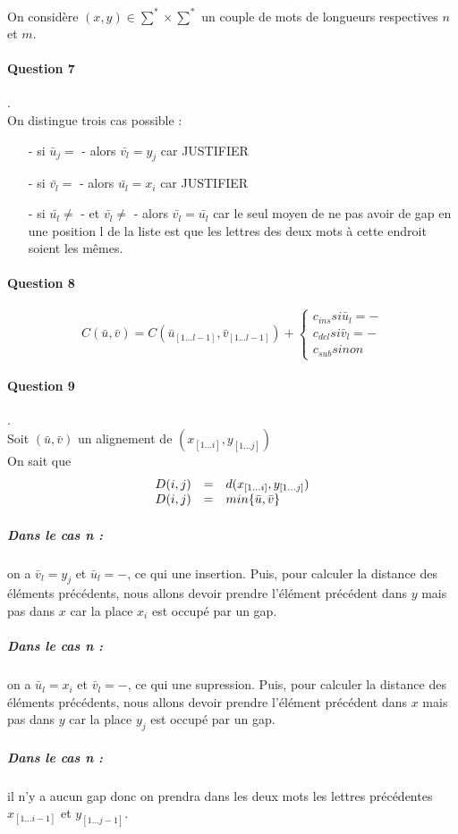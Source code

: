 On considère $(x,y)\in \sum^* \times \sum^*$ un couple de mots de longueurs respectives $n$ et $m$.
\paragraph{Question 7}.\\
On distingue trois cas possible :\begin{itemize}
\item[-] si $\bar{u}_j =$ - alors $\bar{v_l} = y_j$ car JUSTIFIER
\item[-] si $\bar{v_l} =$ - alors $\bar{u_l} = x_i$ car JUSTIFIER
\item[-] si $\bar{u_l} \neq$ - et $\bar{v_l} \neq$ - alors $\bar{v_l} = \bar{u_l}$ car le seul moyen de ne pas avoir de gap en une position l de la liste est que les lettres des deux mots à cette endroit soient les mêmes.
\end{itemize}
\paragraph{Question 8}
$$C(\bar u, \bar v) = C(\bar u_{[1...l-1]}, \bar v_{[1...l-1]}) + \left \{
    \begin{array}{rcl}
        c_{ins} si \bar u_l = -\\
        c_{del} si \bar v_l = -\\
        c_{sub} sinon
    \end{array}
\right.$$
\paragraph{Question 9}.\\
Soit $(\bar u, \bar v)$ un alignement de $(x_{[1...i]} ,y_{[1...j]})$\\
On sait que
$$
 \begin{array}{r c l}
      D(i,j) & = & d(x_{[1...i]} ,y_{[1...j]}) \\
      D(i,j) & = & min\{\bar u, \bar v\}\\
   \end{array}
$$
\subparagraph*{Dans le cas n :}on a $\bar v_l = y_j$ et $\bar u_l = -$, ce qui une insertion. Puis, pour calculer la distance des éléments précédents, nous allons devoir prendre l'élément précédent dans $y$ mais pas dans $x$ car la place $x_i$ est occupé par un gap.
\subparagraph*{Dans le cas n :}on a $\bar u_l = x_i$ et $\bar v_l = -$, ce qui une supression. Puis, pour calculer la distance des éléments précédents, nous allons devoir prendre l'élément précédent dans $x$ mais pas dans $y$ car la place $y_j$ est occupé par un gap.
\subparagraph*{Dans le cas n :}il n'y a aucun gap donc on prendra dans les deux mots les lettres précédentes $x_{[1...i-1]}$ et $y_{[1...j-1]}$.

